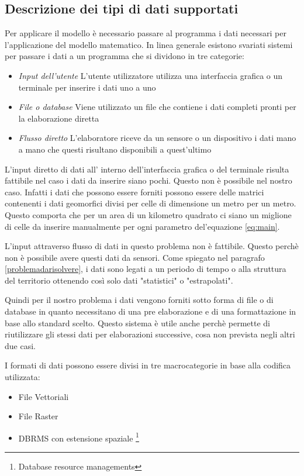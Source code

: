 \subsection{Descrizione dei tipi di dati supportati}

Per applicare il modello \rusle è necessario passare al programma i dati necessari per l'applicazione del modello matematico.
In linea generale esistono svariati sistemi per passare i dati a un programma che si dividono in tre categorie:

\begin{itemize}
	\item \textit{Input dell'utente} L'utente utilizzatore utilizza una interfaccia grafica o un terminale per inserire i dati uno a uno
	\item \textit{File o database} Viene utilizzato un file che contiene i dati completi pronti per la elaborazione diretta
	\item \textit{Flusso diretto} L'elaboratore riceve da un sensore o un dispositivo i dati mano a mano che questi risultano disponibili a quest'ultimo
\end{itemize}

L'input diretto di dati all' interno dell'interfaccia grafica o del terminale risulta fattibile nel caso i dati da inserire siano pochi. Questo non è possibile nel nostro caso. Infatti i dati che possono essere forniti possono essere delle matrici contenenti i dati geomorfici divisi per celle di dimensione un metro per un metro. Questo comporta che per un area di un kilometro quadrato ci siano un miglione di celle da inserire manualmente per ogni parametro del'equazione \eqref{eq:main}.

L'input attraverso flusso di dati in questo problema non è fattibile. Questo perchè non è possibile avere questi dati da sensori. Come spiegato nel paragrafo \ref{problemadarisolvere}, i dati sono legati a un periodo di tempo o alla struttura del territorio ottenendo così solo dati "statistici" o "estrapolati".

Quindi per il nostro problema i dati vengono forniti sotto forma di file o di database in quanto necessitano di una pre elaborazione e di una formattazione in base allo standard scelto.
Questo sistema è utile anche perchè permette di riutilizzare gli stessi dati per elaborazioni successive, cosa non prevista negli altri due casi.

I formati di dati possono essere divisi in tre macrocategorie in base alla codifica utilizzata:
\begin{itemize}
	\item File Vettoriali
	\item File Raster
	\item DBRMS con estensione spaziale \footnote{Database resource managements}
\end{itemize}

